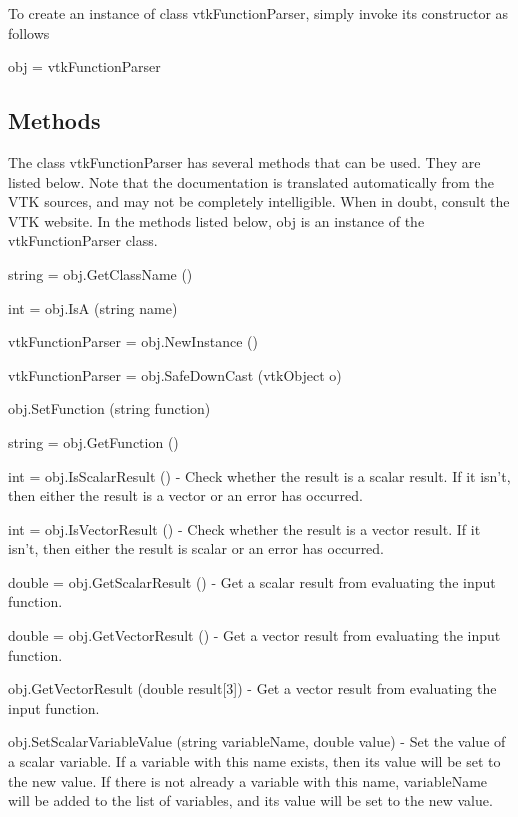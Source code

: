 To create an instance of class vtk\-Function\-Parser, simply invoke its constructor as follows \begin{DoxyVerb}  obj = vtkFunctionParser
\end{DoxyVerb}
 \hypertarget{vtkwidgets_vtkxyplotwidget_Methods}{}\subsection{Methods}\label{vtkwidgets_vtkxyplotwidget_Methods}
The class vtk\-Function\-Parser has several methods that can be used. They are listed below. Note that the documentation is translated automatically from the V\-T\-K sources, and may not be completely intelligible. When in doubt, consult the V\-T\-K website. In the methods listed below, {\ttfamily obj} is an instance of the vtk\-Function\-Parser class. 
\begin{DoxyItemize}
\item {\ttfamily string = obj.\-Get\-Class\-Name ()}  
\item {\ttfamily int = obj.\-Is\-A (string name)}  
\item {\ttfamily vtk\-Function\-Parser = obj.\-New\-Instance ()}  
\item {\ttfamily vtk\-Function\-Parser = obj.\-Safe\-Down\-Cast (vtk\-Object o)}  
\item {\ttfamily obj.\-Set\-Function (string function)}  
\item {\ttfamily string = obj.\-Get\-Function ()}  
\item {\ttfamily int = obj.\-Is\-Scalar\-Result ()} -\/ Check whether the result is a scalar result. If it isn't, then either the result is a vector or an error has occurred.  
\item {\ttfamily int = obj.\-Is\-Vector\-Result ()} -\/ Check whether the result is a vector result. If it isn't, then either the result is scalar or an error has occurred.  
\item {\ttfamily double = obj.\-Get\-Scalar\-Result ()} -\/ Get a scalar result from evaluating the input function.  
\item {\ttfamily double = obj.\-Get\-Vector\-Result ()} -\/ Get a vector result from evaluating the input function.  
\item {\ttfamily obj.\-Get\-Vector\-Result (double result\mbox{[}3\mbox{]})} -\/ Get a vector result from evaluating the input function.  
\item {\ttfamily obj.\-Set\-Scalar\-Variable\-Value (string variable\-Name, double value)} -\/ Set the value of a scalar variable. If a variable with this name exists, then its value will be set to the new value. If there is not already a variable with this name, variable\-Name will be added to the list of variables, and its value will be set to the new value.  

\end{DoxyItemize}
